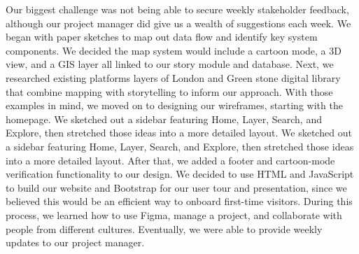 ﻿%


Our biggest challenge was not being able to secure weekly stakeholder feedback, although our project manager did give us a wealth of suggestions each week.
We began with paper sketches to map out data flow and identify key system components. We decided the map system would include a cartoon mode, a 3D view, and a GIS layer all linked to our story module and database.
Next, we researched existing platforms layers of London and Green stone digital library that combine mapping with storytelling to inform our approach.
With those examples in mind, we moved on to designing our wireframes, starting with the homepage. We sketched out a sidebar featuring Home, Layer, Search, and Explore, then stretched those ideas into a more detailed layout.
We sketched out a sidebar featuring Home, Layer, Search, and Explore, then stretched those ideas into a more detailed layout. After that, we added a footer and cartoon-mode verification functionality to our design.
We decided to use HTML and JavaScript to build our website and Bootstrap for our user tour and presentation, since we believed this would be an efficient way to onboard first-time visitors. During this process, we learned how to use Figma, manage a project, and collaborate with people from different cultures. Eventually, we were able to provide weekly updates to our project manager.


